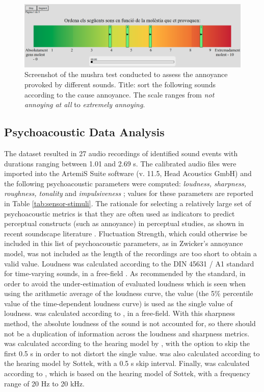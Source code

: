 \begin{figure}
  \label{fig:mushra-test}
  \centering
  \includegraphics[width=\textwidth]{Figures/mushraScreenShot02.png}
  \caption{Screenshot of the \gls{mushra} test conducted to assess the annoyance provoked by different sounds. Title: sort the following sounds according to the cause annoyance. The scale ranges from \emph{not annoying at all} to \emph{extremely annoying}.}
\end{figure}

\subsection{Psychoacoustic Data Analysis}

The dataset resulted in 27 audio recordings of identified sound events with durations ranging between 1.01 and 2.69 s. The calibrated audio files were imported into the ArtemiS Suite software (v. 11.5, Head Acoustics GmbH) and the following psychoacoustic parameters were computed: \emph{loudness, sharpness, roughness, tonality} and \emph{impulsiveness} \citep{PsychoacousticsfactsmodelsZwicker}; values for these parameters are reported in Table \ref{tab:sensor-stimuli}. The rationale for selecting a relatively large set of psychoacoustic metrics is that they are often used as indicators to predict perceptual constructs (such as annoyance) in perceptual studies, as shown in recent soundscape literature \citep{Aletta2016Soundscape,Aletta2017Dimensions}. Fluctuation Strength, which could otherwise be included in this list of psychoacoustic parameters, as in Zwicker's annoyance model, was not included as the length of the recordings are too short to obtain a valid value. Loudness was calculated according to the DIN 45631 / A1 standard for time-varying sounds, in a free-field \citep{DIN2008Calculation}. As recommended by the standard, in order to avoid the under-estimation of evaluated loudness which is seen when using the arithmetic average of the loudness curve, the  value (the 5\% percentile value of the time-dependent loudness curve) is used as the single value of loudness.  was calculated according to \citet{DIN2009measurement}, in a free-field. With this sharpness method, the absolute loudness of the sound is not accounted for, so there should not be a duplication of information across the loudness and sharpness metrics.  was calculated according to the hearing model by \citet{Sottek2017Sound}, with the option to skip the first 0.5 s in order to not distort the single value.  was also calculated according to the hearing model by Sottek, with a 0.5 s skip interval. Finally,  was calculated according to \citet{ECMA742019Measurement}, which is based on the hearing model of Sottek, with a frequency range of 20 Hz to 20 kHz.


